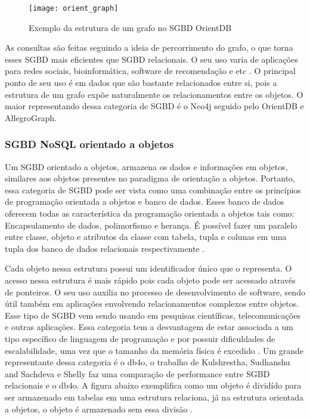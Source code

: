 \begin{figure}[h]
	\centering
    \texttt{[image: orient\_graph]}
    \caption{Exemplo da estrutura de um grafo no SGBD OrientDB}
    \label{fig:graph_orientdb}
\end{figure}
	
	As consultas são feitas seguindo a ideia de percorrimento do grafo, o que torna esses SGBD mais eficientes que SGBD relacionais. O seu uso varia de aplicações para redes sociais, bioinformática, software de recomendação e etc \cite{nayak2013type}. O principal ponto de seu uso é em dados que são bastante relacionados entre si, pois a estrutura de um grafo expõe naturalmente os relacionamentos entre os objetos. O maior representando dessa categoria de SGBD é o Neo4j seguido pelo OrientDB e AllegroGraph.
	
\subsubsection{SGBD NoSQL orientado a objetos}
	Um SGBD orientado a objetos, armazena os dados e informações em objetos, similares aos objetos presentes no paradigma de orientação a objetos. Portanto, essa categoria de SGBD pode ser vista como uma combinação entre os princípios de programação orientada a objetos e banco de dados. Esses banco de dados oferecem todas as característica da programação orientada a objetos tais como: Encapsulamento de dados, polimorfismo e herança. É possível fazer um paralelo entre classe, objeto e atributos da classe com tabela, tupla e colunas em uma tupla dos banco de dados relacionais respectivamente \cite{nayak2013type}.
	
	Cada objeto nessa estrutura possui um identificador único que o representa. O acesso nessa estrutura é mais rápido pois cada objeto pode ser acessado através de ponteiros. O seu uso auxilia no processo de desenvolvimento de software, sendo útil também em aplicações envolvendo relacionamentos complexos entre objetos. Esse tipo de SGBD vem sendo usando em pesquisas científicas, telecomunicações e outras aplicações. Essa categoria tem a desvantagem de estar associada a um tipo específico de linguagem de programação e por possuir dificuldades de escalabilidade, uma vez que o tamanho da memória física é excedido \cite{nayak2013type}. Um grande representante dessa categoria é o db4o, o trabalho de Kulshrestha, Sudhanshu and Sachdeva e Shelly \cite{kulshrestha2014performance} faz uma comparação de performance entre SGBD relacionais e o db4o. A figura abaixo exemplifica como um objeto é dividído para ser armazenado em tabelas em uma estrutura relaciona, já na estrutura orientada a objetos, o objeto é armazenado sem essa divisão \cite{edlich2006definitive}.
	

